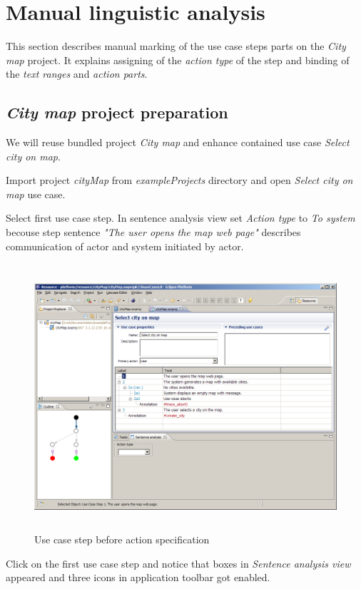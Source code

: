 \section{Manual linguistic analysis}

This section describes manual marking of the use case steps parts on the \emph{City map} project. 
It explains assigning of the \emph{action type} of the step and binding of the \emph{text ranges} and \emph{action parts}.

\subsection{\emph{City map} project preparation}
We will reuse bundled project \emph{City map} and enhance contained use case \emph{Select city on map}. 

Import project \emph{cityMap} from \emph{exampleProjects} directory and open \emph{Select city on map} use case.

Select first use case step. In sentence analysis view set \emph{Action type} to \emph{To system}
becouse step sentence \emph{"The user opens the map web page"} describes communication of actor and system initiated by actor.

\begin{figure}[ht]
  \centering
  \includegraphics[height=280pt]{images/manual-analysis/step1-action-not-selected}
  \caption{Use case step before action specification}
  \label{fig:reprotoolUCEditor}
\end{figure}

Click on the first use case step and notice that boxes in \emph{Sentence analysis view} appeared and three icons in application toolbar got enabled.

